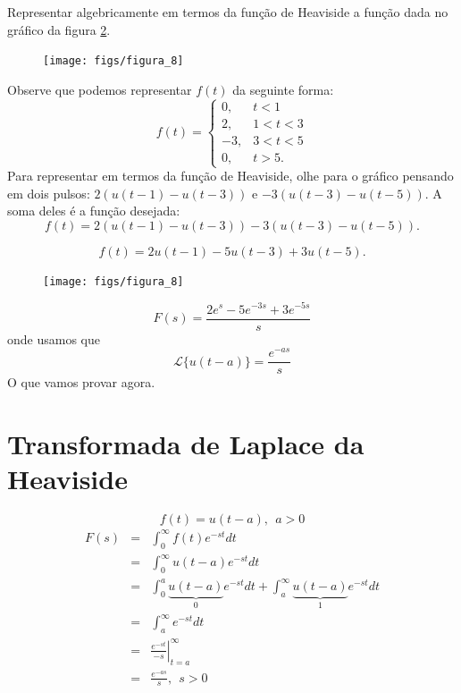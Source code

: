 \documentclass[a4paper,10pt]{book}
\begin{document}
 Representar algebricamente em termos da função de Heaviside a função dada no gráfico da figura \ref{fig_Heaviside_4}.
\begin{figure}[!ht]
\begin{center}

\texttt{[image: figs/figura\_8]}\end{center}
\caption{\label{fig_Heaviside_4}}
\end{figure} 
 Observe que podemos representar $f(t)$ da seguinte forma:
 \begin{equation}
  f(t)=\left\{ \begin{array}{ll} 0, &t<1\\2,&1<t<3\\-3,& 3<t<5\\0,&t>5. \end{array}\right.
 \end{equation}
 Para representar em termos da função de Heaviside, olhe para o gráfico pensando em dois pulsos: $2(u(t-1)-u(t-3))$ e $-3(u(t-3)-u(t-5))$. A soma deles é a função desejada:
 \begin{equation}
 f(t)=2(u(t-1)-u(t-3))-3(u(t-3)-u(t-5)).
 \end{equation}

 \begin{equation}
 f(t)=2u(t-1)-5u(t-3)+3u(t-5).
 \end{equation}
 \begin{figure}[!ht]
\begin{center}

\texttt{[image: figs/figura\_8]}\end{center}
\caption{\label{fig_Heaviside_4}}
\end{figure} 
 $$F(s)=\frac{2e^{s}-5e^{-3s}+3e^{-5s}}{s}$$
onde usamos que
$$\mathcal{L}\{u(t-a)\}=\frac{e^{-as}}{s}$$
O que vamos provar agora.  
 \section{Transformada de Laplace da Heaviside}
% 
 $$f(t)=u(t-a), ~~a>0$$
% 
 \begin{eqnarray*}
  F(s)&=&\int_0^\infty f(t)e^{-st}dt\\
  &=&\int_0^\infty u(t-a)e^{-st}dt\\
&=&\int_0^a \underbrace{u(t-a)}_{0}e^{-st}dt + \int_a^\infty \underbrace{u(t-a)}_{1}e^{-st}dt\\
&=& \int_a^\infty e^{-st}dt\\
&=&\left.\frac{e^{-st}}{-s}\right|_{t=a}^\infty\\
&=&\frac{e^{-as}}{s},~~s>0
\end{eqnarray*}
% 
\end{document}
